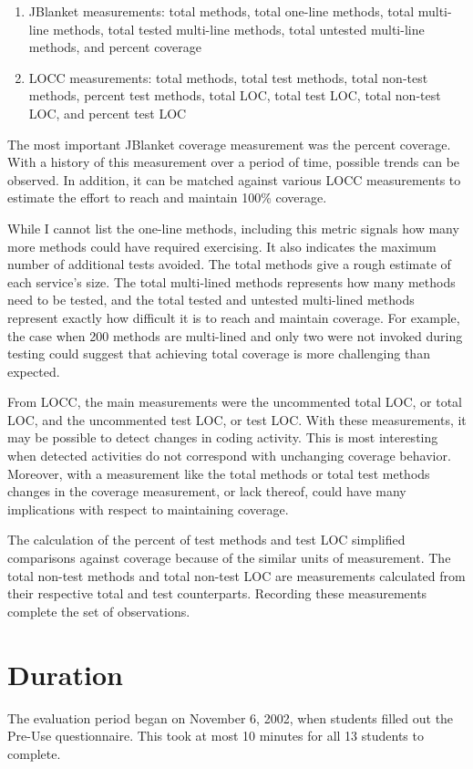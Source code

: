 \begin{enumerate}
  \item JBlanket measurements: total methods, total one-line methods, total
        multi-line methods, total tested multi-line methods, total untested
        multi-line methods, and percent coverage
  \item LOCC measurements: total methods, total test methods, total
        non-test methods, percent test methods, total LOC, total test LOC,
        total non-test LOC, and percent test LOC
\end{enumerate}
The most important JBlanket coverage measurement was the percent coverage.
With a history of this measurement over a period of time, possible trends
can be observed.  In addition, it can be matched against various LOCC
measurements to estimate the effort to reach and maintain 100\%
coverage.

While I cannot list the one-line methods, including this metric signals how
many more methods could have required exercising.  It also indicates the
maximum number of additional tests avoided.  The total methods give a rough
estimate of each service's size.  The total multi-lined methods represents
how many methods need to be tested, and the total tested and untested
multi-lined methods represent exactly how difficult it is to reach and
maintain coverage.  For example, the case when 200 methods are multi-lined
and only two were not invoked during testing could suggest that achieving
total coverage is more challenging than expected.

From LOCC, the main measurements were the uncommented total LOC, or total
LOC, and the uncommented test LOC, or test LOC.  With these measurements,
it may be possible to detect changes in coding activity.  This is most
interesting when detected activities do not correspond with unchanging
coverage behavior.  Moreover, with a measurement like the total methods or
total test methods changes in the coverage measurement, or lack thereof,
could have many implications with respect to maintaining coverage.

The calculation of the percent of test methods and test LOC simplified
comparisons against coverage because of the similar units of measurement.
The total non-test methods and total non-test LOC are measurements
calculated from their respective total and test counterparts.  Recording
these measurements complete the set of observations.

\section{Duration}
The evaluation period began on November 6, 2002, when students filled out
the Pre-Use questionnaire.  This took at most 10 minutes for all 13
students to complete.

